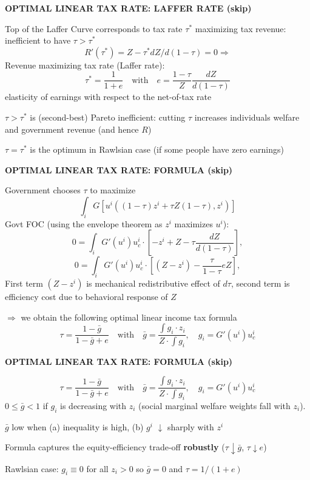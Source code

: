 \documentclass[landscape]{slides}
\begin{document}
\begin{slide}
\begin{center}
{\bf OPTIMAL LINEAR TAX RATE: LAFFER RATE (skip)}
\end{center}
Top of the Laffer Curve corresponds to tax rate $\tau^*$
maximizing tax revenue: inefficient to have $\tau>\tau^*$
\[R'(\tau^*)=Z - \tau^* d Z/ d(1-\tau)=0 \Rightarrow \]
Revenue maximizing tax rate (Laffer rate): 
\[ \tau^*=\frac{1}{1+e} \quad \mathrm{ with } \quad e=\frac{1-\tau}{Z} \frac{d Z}{ d(1-\tau)} \] 
elasticity of earnings with respect to the net-of-tax rate

$\tau>\tau^*$ is (second-best) Pareto inefficient: cutting $\tau$ increases individuals welfare and
government revenue (and hence $R$)

$\tau=\tau^*$ is the optimum in Rawlsian case (if some people have zero earnings)
\end{slide}

\begin{slide}

\end{slide}


\begin{slide}
\begin{center}
{\bf OPTIMAL LINEAR TAX RATE: FORMULA (skip)}
\end{center}
Government chooses $\tau$ to maximize
\[ \int_i G[u^i((1-\tau)z^i+\tau Z(1-\tau),z^i)] \]
Govt FOC (using the envelope theorem as $z^i$ maximizes $u^i$):
\[ 0 = \int_i G'(u^i) u^i_c \cdot
\left [-z^i + Z - \tau \frac{dZ}{d(1-\tau)} \right ] ,\]
\[ 0 = \int_i G'(u^i) u^i_c \cdot
\left [(Z-z^i) - \frac{\tau}{1-\tau} e Z \right ],\]
First term $(Z-z^i)$ is mechanical redistributive effect of $d\tau$, second term is efficiency cost due to behavioral 
response of $Z$

$\Rightarrow$ we obtain the following optimal linear income tax formula
\[
\tau= \frac{1-\bar{g}}{1-\bar{g} + e} \quad \mathrm{with} \quad
\bar{g}= \frac{ \int g_i \cdot z_i  }{Z \cdot \int g_i}, \quad g_i =  G'(u^i) u^i_c
\]

\end{slide}

\begin{slide}
\begin{center}
{\bf OPTIMAL LINEAR TAX RATE: FORMULA (skip)}
\end{center}
\[
\tau= \frac{1-\bar{g}}{1-\bar{g} + e} \quad \mathrm{with} \quad
\bar{g}= \frac{ \int g_i \cdot z_i  }{Z \cdot \int g_i}, \quad g_i =  G'(u^i) u^i_c
\]
$0\leq \bar{g} <1$ if $g_i$ is decreasing with $z_i$ (social marginal welfare weights
fall with $z_i$). 

$\bar{g}$ low when (a) inequality is high, (b) $g^i$ $\downarrow$ sharply with $z^i$

Formula captures the equity-efficiency trade-off \textbf{robustly} ($\tau \downarrow \bar{g}$, $\tau \downarrow e$)

Rawlsian case: $g_i \equiv 0$ for all $z_i>0$ so $\bar{g}=0$ and $\tau=1/(1+e)$

\end{slide}
\end{document}

